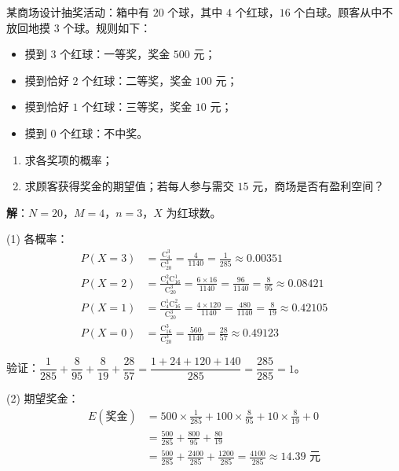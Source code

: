 \documentclass[12pt, a4paper]{ctexart}
\begin{document}
\begin{appbox}[【应用3】抽奖活动设计]
某商场设计抽奖活动：箱中有 $20$ 个球，其中 $4$ 个红球，$16$ 个白球。顾客从中不放回地摸 $3$ 个球。规则如下：
\begin{itemize}
  \item 摸到 $3$ 个红球：一等奖，奖金 $500$ 元；
  \item 摸到恰好 $2$ 个红球：二等奖，奖金 $100$ 元；
  \item 摸到恰好 $1$ 个红球：三等奖，奖金 $10$ 元；
  \item 摸到 $0$ 个红球：不中奖。
\end{itemize}
\begin{enumerate}[label=(\arabic*)]
  \item 求各奖项的概率；
  \item 求顾客获得奖金的期望值；若每人参与需交 $15$ 元，商场是否有盈利空间？
\end{enumerate}
\end{appbox}

\textbf{解}：$N=20$，$M=4$，$n=3$，$X$ 为红球数。

(1) 各概率：
\begin{align*}
P(X=3) &= \frac{\mathrm{C}_4^3}{\mathrm{C}_{20}^3} = \frac{4}{1140} = \frac{1}{285} \approx 0.00351 \\[4pt]
P(X=2) &= \frac{\mathrm{C}_4^2 \mathrm{C}_{16}^1}{\mathrm{C}_{20}^3} = \frac{6 \times 16}{1140} = \frac{96}{1140} = \frac{8}{95} \approx 0.08421 \\[4pt]
P(X=1) &= \frac{\mathrm{C}_4^1 \mathrm{C}_{16}^2}{\mathrm{C}_{20}^3} = \frac{4 \times 120}{1140} = \frac{480}{1140} = \frac{8}{19} \approx 0.42105 \\[4pt]
P(X=0) &= \frac{\mathrm{C}_{16}^3}{\mathrm{C}_{20}^3} = \frac{560}{1140} = \frac{28}{57} \approx 0.49123
\end{align*}

验证：$\dfrac{1}{285} + \dfrac{8}{95} + \dfrac{8}{19} + \dfrac{28}{57} = \dfrac{1 + 24 + 120 + 140}{285} = \dfrac{285}{285} = 1$。\checkmark

(2) 期望奖金：
\begin{align*}
E(\text{奖金}) &= 500 \times \frac{1}{285} + 100 \times \frac{8}{95} + 10 \times \frac{8}{19} + 0 \\
&= \frac{500}{285} + \frac{800}{95} + \frac{80}{19} \\
&= \frac{500}{285} + \frac{2400}{285} + \frac{1200}{285} = \frac{4100}{285} \approx 14.39 \text{ 元}
\end{align*}
\end{document}
